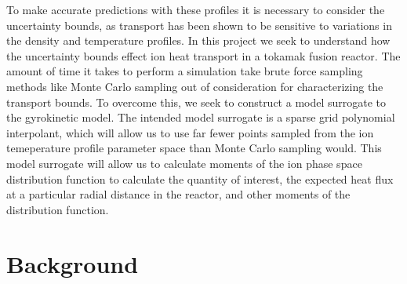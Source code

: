 \documentclass{article}
\begin{document}
\vspace{0.01cm}

To make accurate predictions with these profiles it is necessary to consider the uncertainty bounds, as transport has been shown to be sensitive to variations in the density and temperature profiles. In this project we seek to understand how the uncertainty bounds effect ion heat transport in a tokamak fusion reactor. The amount of time it takes to perform a simulation take brute force sampling methods like Monte Carlo sampling out of consideration for characterizing the transport bounds. To overcome this, we seek to construct a model surrogate to the gyrokinetic model. The intended model surrogate is a sparse grid polynomial interpolant, which will allow us to use far fewer points sampled from the ion temeperature profile parameter space than Monte Carlo sampling would. This model surrogate will allow us to calculate moments of the ion phase space distribution function to calculate the quantity of interest, the expected heat flux at a particular radial distance in the reactor, and other moments of the distribution function.  \\
\newpage
\section{Background}
\end{document}
